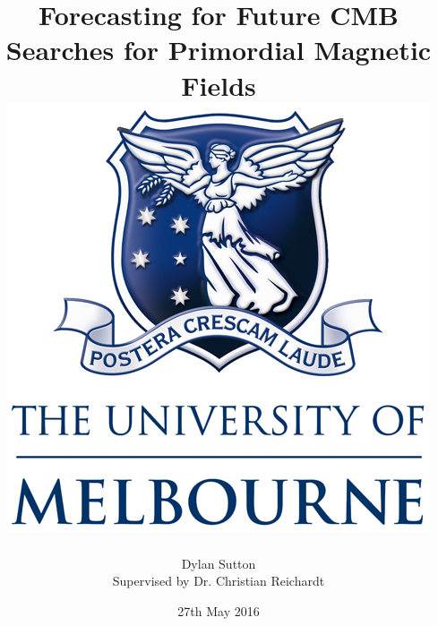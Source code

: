 \documentclass[12pt]{article}
\title{
	{Forecasting for Future CMB Searches for Primordial Magnetic Fields}\\
	{\includegraphics{UOM.png}}
}
\author{
	{Dylan Sutton}\\
	{Supervised by Dr. Christian Reichardt}
}
\date{27th May 2016}
\begin{document}
\maketitle
\makeindex
\pagebreak

\tableofcontents








%

\end{document}

